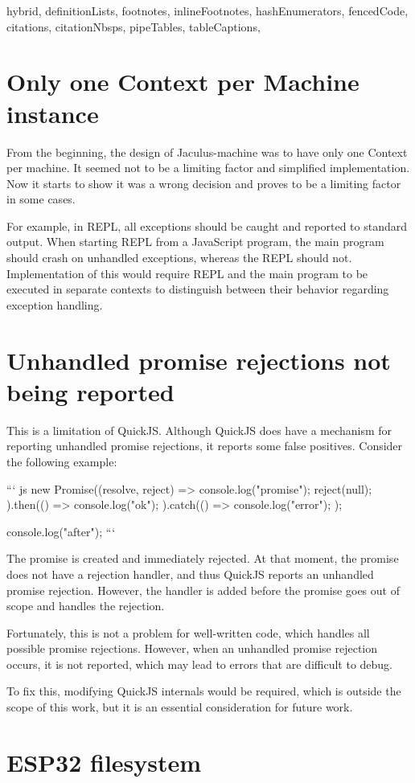 \documentclass[
  digital,
  oneside,
  nosansbold,
  nocolorbold,
  lof,
  lot
]{fithesis4}
\begin{document}
\begin{markdown*}{%
  hybrid,
  definitionLists,
  footnotes,
  inlineFootnotes,
  hashEnumerators,
  fencedCode,
  citations,
  citationNbsps,
  pipeTables,
  tableCaptions,
}
\section{Only one Context per Machine instance}

From the beginning, the design of Jaculus-machine was to have only one Context per machine. It seemed not to be a limiting factor and simplified implementation. Now it starts to show it was a wrong decision and proves to be a limiting factor in some cases.

For example, in REPL, all exceptions should be caught and reported to standard output. When starting REPL from a JavaScript program, the main program should crash on unhandled exceptions, whereas the REPL should not. Implementation of this would require REPL and the main program to be executed in separate contexts to distinguish between their behavior regarding exception handling.


\section{Unhandled promise rejections not being reported}

This is a limitation of QuickJS. Although QuickJS does have a mechanism for reporting unhandled promise rejections, it reports some false positives. Consider the following example:

``` js
new Promise((resolve, reject) => {
    console.log("promise");
    reject(null);
}).then(() => {
    console.log("ok");
}).catch(() => {
    console.log("error");
});

console.log("after");
```

The promise is created and immediately rejected. At that moment, the promise does not have a rejection handler, and thus QuickJS reports an unhandled promise rejection. However, the handler is added before the promise goes out of scope and handles the rejection.

Fortunately, this is not a problem for well-written code, which handles all possible promise rejections. However, when an unhandled promise rejection occurs, it is not reported, which may lead to errors that are difficult to debug.

To fix this, modifying QuickJS internals would be required, which is outside the scope of this work, but it is an essential consideration for future work.


\section{ESP32 filesystem}


\end{markdown*}
\end{document}
